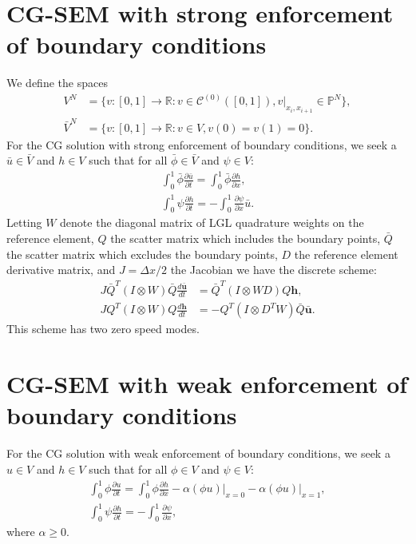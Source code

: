\documentclass[american]{article}
\renewcommand{\vec}[1] {\ensuremath{\bm{#1}}}
\newcommand{\mat}[1] {\ensuremath{#1}}
\newcommand{\der}  [2]{\frac{d#1}{d#2}}
\newcommand{\pder} [2]{\frac{\partial#1}{\partial#2}}
\begin{document}
\section{CG-SEM with strong enforcement of boundary conditions}
We define the spaces
\begin{equation}
  \begin{split}
    V^{N} &= \{
      v: [0, 1] \rightarrow \mathbb{R}:
      v \in \mathcal{C}^{(0)}([0, 1]),
      v|_{x_{i}, x_{i+1}} \in \mathbb{P}^{N}
    \},\\
    \bar{V}^{N} &= \{
      v: [0, 1] \rightarrow \mathbb{R}:
      v \in V,
      v(0) = v(1) = 0
    \}.
    \end{split}
\end{equation}
For the CG solution with strong enforcement of boundary conditions, we seek a
$\bar{u} \in \bar{V}$ and $h \in V$ such that for all $\bar{\phi} \in \bar{V}$
and $\psi \in V$:
\begin{equation}
  \begin{split}
    \int_{0}^{1} \bar{\phi} \pder{\bar{u}}{t} = \int_{0}^{1} \bar{\phi} \pder{h}{x},\\
    \int_{0}^{1} \psi \pder{h}{t} = -\int_{0}^{1} \pder{\psi}{x} \bar{u}.
  \end{split}
\end{equation}
Letting $\mat{W}$ denote the diagonal matrix of LGL quadrature weights on the
reference element, $\mat{Q}$ the scatter matrix which includes the boundary
points, $\mat{\bar{Q}}$ the scatter matrix which excludes the boundary points,
$\mat{D}$ the reference element derivative matrix, and $J = \Delta x / 2$ the
Jacobian we have the discrete scheme:
\begin{equation}
  \begin{split}
    J \mat{\bar{Q}}^{T} (\mat{I} \otimes \mat{W}) \mat{\bar{Q}} \der{\vec{\bar{u}}}{t}
    &=
    \mat{\bar{Q}}^{T} (\mat{I} \otimes \mat{W} \mat{D}) \mat{Q} \vec{h},\\
    J \mat{Q}^{T} (\mat{I} \otimes \mat{W}) \mat{Q} \der{\vec{h}}{t}
    &=
    -\mat{Q}^{T} (\mat{I} \otimes \mat{D}^{T} \mat{W}) \mat{\bar{Q}} \vec{\bar{u}}.
  \end{split}
\end{equation}
This scheme has two zero speed modes.

\section{CG-SEM with weak enforcement of boundary conditions}
For the CG solution with weak enforcement of boundary conditions, we seek a
$u \in V$ and $h \in V$ such that for all $\phi \in V$ and $\psi \in V$:
\begin{equation}
  \begin{split}
    \int_{0}^{1} \phi \pder{u}{t} = \int_{0}^{1} \phi \pder{h}{x}
    - \alpha {\left.\left(\phi u\right)\right|}_{x = 0}
    - \alpha {\left.\left(\phi u\right)\right|}_{x = 1},\\
    \int_{0}^{1} \psi \pder{h}{t} = -\int_{0}^{1} \pder{\psi}{x},
  \end{split}
\end{equation}
where $\alpha \ge 0$.
\end{document}
